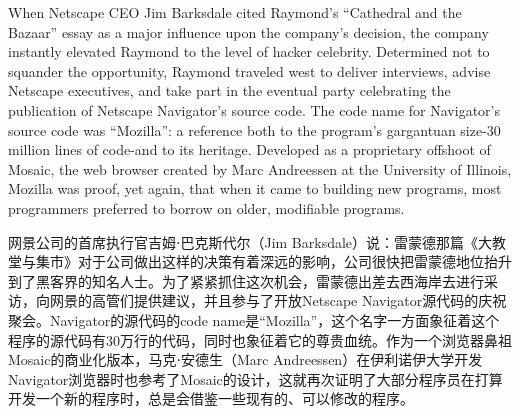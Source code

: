 \ifdefined\eng
When Netscape CEO Jim Barksdale cited Raymond's ``Cathedral and the Bazaar'' essay as a major influence upon the company's decision, the company instantly elevated Raymond to the level of hacker celebrity. Determined not to squander the opportunity, Raymond traveled west to deliver interviews, advise Netscape executives, and take part in the eventual party celebrating the publication of Netscape Navigator's source code. The code name for Navigator's source code was ``Mozilla'': a reference both to the program's gargantuan size-30 million lines of code-and to its heritage. Developed as a proprietary offshoot of Mosaic, the web browser created by Marc Andreessen at the University of Illinois, Mozilla was proof, yet again, that when it came to building new programs, most programmers preferred to borrow on older, modifiable programs.
\fi

\ifdefined\chs
网景公司的首席执行官吉姆⋅巴克斯代尔（Jim Barksdale）说：雷蒙德那篇《大教堂与集市》对于公司做出这样的决策有着深远的影响，公司很快把雷蒙德地位抬升到了黑客界的知名人士。为了紧紧抓住这次机会，雷蒙德出差去西海岸去进行采访，向网景的高管们提供建议，并且参与了开放Netscape Navigator源代码的庆祝聚会。Navigator的源代码的code name是``Mozilla''，这个名字一方面象征着这个程序的源代码有30万行的代码，同时也象征着它的尊贵血统。作为一个浏览器鼻祖Mosaic的商业化版本，马克⋅安德生（Marc Andreessen）在伊利诺伊大学开发Navigator浏览器时也参考了Mosaic的设计，这就再次证明了大部分程序员在打算开发一个新的程序时，总是会借鉴一些现有的、可以修改的程序。
\fi



